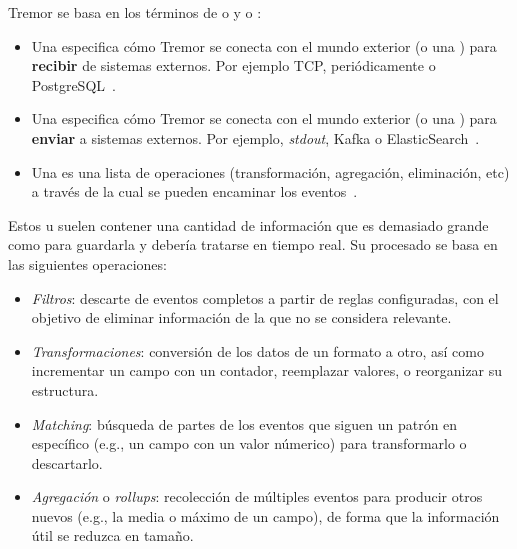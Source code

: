 Tremor se basa en los términos de \onramps o \sources y \offramps o \sinks:

\begin{itemize}
    \item Una \onramp especifica cómo Tremor se conecta con el mundo exterior (o
        una \pipeline) para \textbf{recibir} de sistemas externos. Por ejemplo
        TCP, periódicamente o PostgreSQL~\cite{tremoronramps}.

    \item Una \offramp especifica cómo Tremor se conecta con el mundo exterior
        (o una \pipeline) para \textbf{enviar} a sistemas externos. Por ejemplo,
        \emph{stdout}, Kafka o ElasticSearch~\cite{tremorofframps}.

    \item Una \pipeline es una lista de operaciones (transformación, agregación,
        eliminación, etc) a través de la cual se pueden encaminar los
        eventos~\cite{tremorpipelines}.

\end{itemize}

Estos \onramps u \offramps suelen contener una cantidad de información que es
demasiado grande como para guardarla y debería tratarse en tiempo real. Su
procesado se basa en las siguientes operaciones:

\begin{itemize}
    \item \emph{Filtros}: descarte de eventos completos a partir de reglas
        configuradas, con el objetivo de eliminar información de la \pipeline
        que no se considera relevante.

    \item \emph{Transformaciones}: conversión de los datos de un formato a otro,
        así como incrementar un campo con un contador, reemplazar valores, o
        reorganizar su estructura.

    \item \emph{Matching}: búsqueda de partes de los eventos que siguen un
        patrón en específico (e.g., un campo  con un valor númerico)
        para transformarlo o descartarlo.

    \item \emph{Agregación} o \emph{rollups}: recolección de múltiples eventos
        para producir otros nuevos (e.g., la media o máximo de un campo), de
        forma que la información útil se reduzca en tamaño.

\end{itemize}


